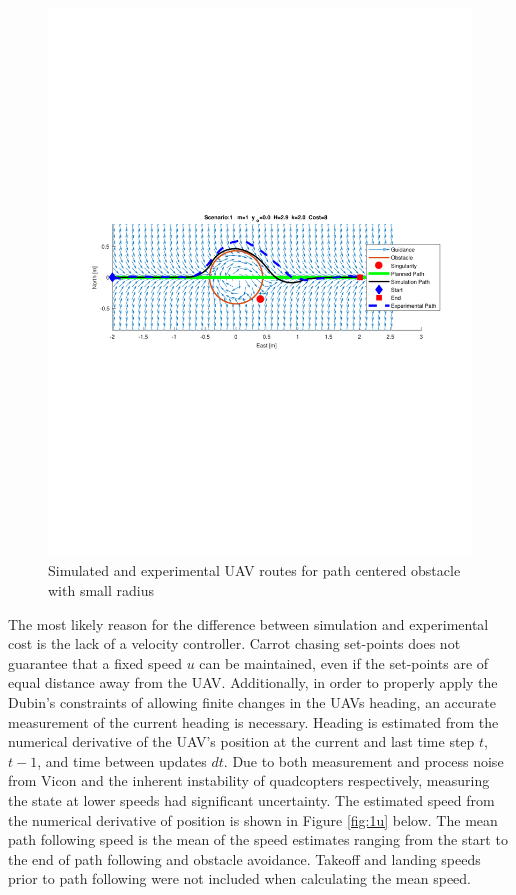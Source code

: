 \documentclass[numbered,pdftex]{ohio-etd}
\begin{document}
\begin{figure}[H]
	\centering
	\includegraphics[trim = 50 300 0 285, clip, width=16.5cm]{Figures/results/compareFigures/1Quiver}
	\caption{Simulated and experimental UAV routes for path centered obstacle with small radius}
	\label{fig:1Quiver}
\end{figure}

The most likely reason for the difference between simulation and experimental cost is the lack of a velocity controller. Carrot chasing set-points does not guarantee that a fixed speed $u$ can be maintained, even if the set-points are of equal distance away from the UAV. Additionally, in order to properly apply the Dubin's constraints of allowing finite changes in the UAVs heading, an accurate measurement of the current heading is necessary. Heading is estimated from the numerical derivative of the UAV's position at the current and last time step $t$, $t-1$, and time between updates $dt$. Due to both measurement and process noise from Vicon and the inherent instability of quadcopters respectively, measuring the state at lower speeds had significant uncertainty. The estimated speed from the numerical derivative of position is shown in Figure \ref{fig:1u} below. The mean path following speed is the mean of the speed estimates ranging from the start to the end of path following and obstacle avoidance. Takeoff and landing speeds prior to path following were not included when calculating the  mean speed. 
\end{document}

